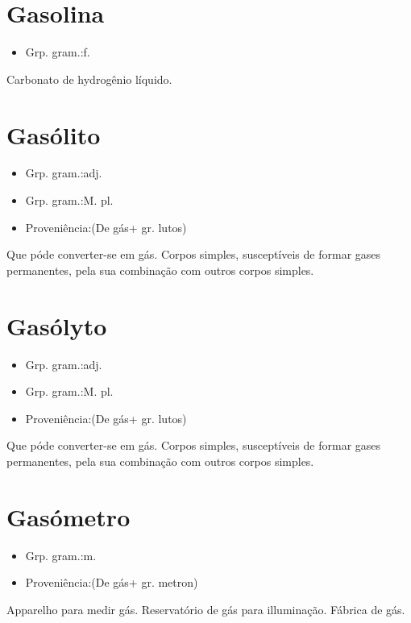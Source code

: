 \section{Gasolina}
\begin{itemize}
\item {Grp. gram.:f.}
\end{itemize}
Carbonato de hydrogênio líquido.
\section{Gasólito}
\begin{itemize}
\item {Grp. gram.:adj.}
\end{itemize}
\begin{itemize}
\item {Grp. gram.:M. pl.}
\end{itemize}
\begin{itemize}
\item {Proveniência:(De \textunderscore gás\textunderscore  + gr. \textunderscore lutos\textunderscore )}
\end{itemize}
Que póde converter-se em gás.
Corpos simples, susceptíveis de formar gases permanentes, pela sua combinação com outros corpos simples.
\section{Gasólyto}
\begin{itemize}
\item {Grp. gram.:adj.}
\end{itemize}
\begin{itemize}
\item {Grp. gram.:M. pl.}
\end{itemize}
\begin{itemize}
\item {Proveniência:(De \textunderscore gás\textunderscore  + gr. \textunderscore lutos\textunderscore )}
\end{itemize}
Que póde converter-se em gás.
Corpos simples, susceptíveis de formar gases permanentes, pela sua combinação com outros corpos simples.
\section{Gasómetro}
\begin{itemize}
\item {Grp. gram.:m.}
\end{itemize}
\begin{itemize}
\item {Proveniência:(De \textunderscore gás\textunderscore  + gr. \textunderscore metron\textunderscore )}
\end{itemize}
Apparelho para medir gás.
Reservatório de gás para illuminação.
Fábrica de gás.
